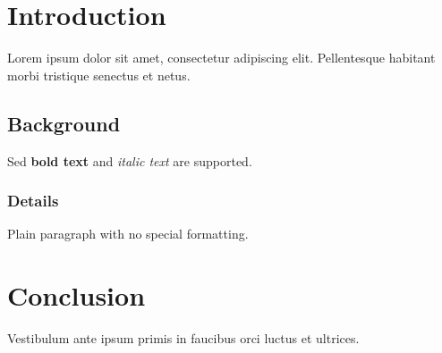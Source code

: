 \documentclass{article}
\begin{document}
\section{Introduction}

Lorem ipsum dolor sit amet, consectetur adipiscing elit.
Pellentesque habitant morbi tristique senectus et netus.

\subsection{Background}

Sed \textbf{bold text} and \textit{italic text} are supported.

\subsubsection{Details}

Plain paragraph with no special formatting.

\section{Conclusion}

Vestibulum ante ipsum primis in faucibus orci luctus et ultrices.
\end{document}
